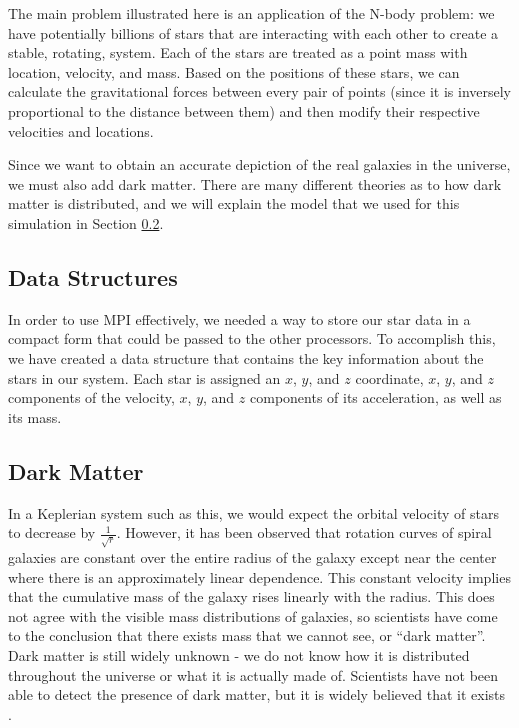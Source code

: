 \documentclass{article}
\begin{document}
The main problem illustrated here is an application of the N-body problem:  we have potentially billions of stars that are interacting with each other to create a stable, rotating, system.  Each of the stars are treated as a point mass with location, velocity, and mass.  Based on the positions of these stars, we can calculate the gravitational forces between every pair of points (since it is inversely proportional to the distance between them) and then modify their respective velocities and locations.  

Since we want to obtain an accurate depiction of the real galaxies in the universe, we must also add dark matter.  There are many different theories as to how dark matter is distributed, and we will explain the model that we used for this simulation in Section \ref{subsec:dark_matter_section}. 

\subsection{Data Structures}

In order to use MPI effectively, we needed a way to store our star data in a compact form that could be passed to the other processors.  To accomplish this, we have created a data structure that contains the key information about the stars in our system.  Each star is assigned an $x$, $y$, and $z$ coordinate, $x$, $y$, and $z$ components of the velocity, $x$, $y$, and $z$ components of its acceleration, as well as its mass.  

\subsection{Dark Matter}
\label{subsec:dark_matter_section}

In a Keplerian system such as this, we would expect the orbital velocity of stars to decrease by $\frac{1}{\sqrt{r}}$.  However, it has been observed that rotation curves of spiral galaxies are constant over the entire radius of the galaxy except near the center where there is an approximately linear dependence.  This constant velocity implies that the cumulative mass of the galaxy rises linearly with the radius.  This does not agree with the visible mass distributions of galaxies, so scientists have come to the conclusion that there exists mass that we cannot see, or ``dark matter''.  Dark matter is still widely unknown - we do not know how it is distributed throughout the universe or what it is actually made of.  Scientists have not been able to detect the presence of dark matter, but it is widely believed that it exists \cite{rotation-dynamics}.
\end{document}
